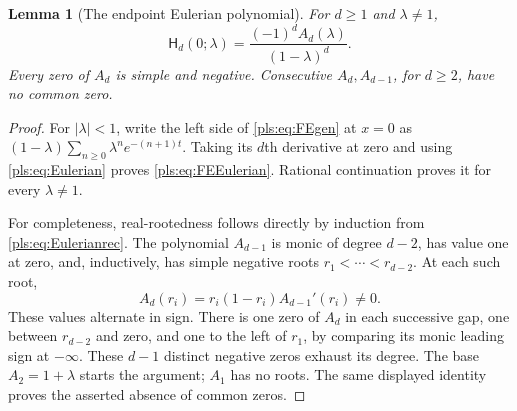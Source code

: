 \documentclass[11pt,letterpaper]{article}
\numberwithin{equation}{section}
\newtheorem{lemma}[theorem]{Lemma}
\theoremstyle{definition}
\theoremstyle{remark}\newtheorem{remark}[theorem]{Remark}
\newcommand{\HFE}{\mathsf H}
\begin{document}
\begin{lemma}[The endpoint Eulerian polynomial]\label{pls:lem:Eulerian}
For $d\ge1$ and $\lambda\ne1$,
\begin{equation}\label{pls:eq:FEEulerian}
 \HFE_d(0;\lambda)=\frac{(-1)^d A_d(\lambda)}{(1-\lambda)^d}.
\end{equation}
Every zero of $A_d$ is simple and negative. Consecutive $A_d,A_{d-1}$, for $d\ge2$,
have no common zero.
\end{lemma}
\begin{proof}
For $|\lambda|<1$, write the left side of \eqref{pls:eq:FEgen} at
$x=0$ as
$(1-\lambda)\sum_{n\ge0}\lambda^n e^{-(n+1)t}$.
Taking its $d$th derivative at zero and using
\eqref{pls:eq:Eulerian} proves \eqref{pls:eq:FEEulerian}.
Rational continuation proves it for every $\lambda\ne1$.

For completeness, real-rootedness follows directly by induction from
\eqref{pls:eq:Eulerianrec}. The polynomial $A_{d-1}$ is monic of
degree $d-2$, has value one at zero, and, inductively, has simple
negative roots $r_1<\cdots<r_{d-2}$. At each such root,
\[
 A_d(r_i)=r_i(1-r_i)A_{d-1}'(r_i)\ne0.
\]
These values alternate in sign. There is one zero of $A_d$ in each
successive gap, one between $r_{d-2}$ and zero, and one to the left
of $r_1$, by comparing its monic leading sign at $-\infty$.
These $d-1$ distinct negative zeros exhaust its degree. The base
$A_2=1+\lambda$ starts the argument; $A_1$ has no roots. The same
displayed identity proves the asserted absence of common zeros.
\end{proof}
\end{document}
